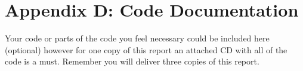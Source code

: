\section{Appendix D: Code Documentation}
Your code or parts of the code you feel necessary could be included here (optional)  however  for one copy of this report an  attached  CD with all of the code is a must.
Remember you will  deliver three copies of this report.

